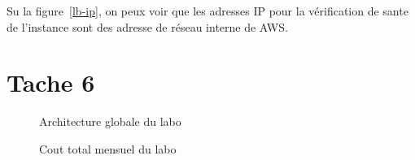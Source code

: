 \documentclass[french,a4paper,11pt]{article}
\begin{document}
    Su la figure~\ref{lb-ip}, on peux voir que les adresses IP pour la vérification de sante de l'instance sont des adresse de réseau interne de AWS.

    \section{Tache 6}\label{sec:task-6}

    \begin{figure}
        \caption{\label{archi}Architecture globale du labo}
    \end{figure}

    \begin{figure}
        \caption{\label{total-cost}Cout total mensuel du labo}
    \end{figure}
\end{document}
